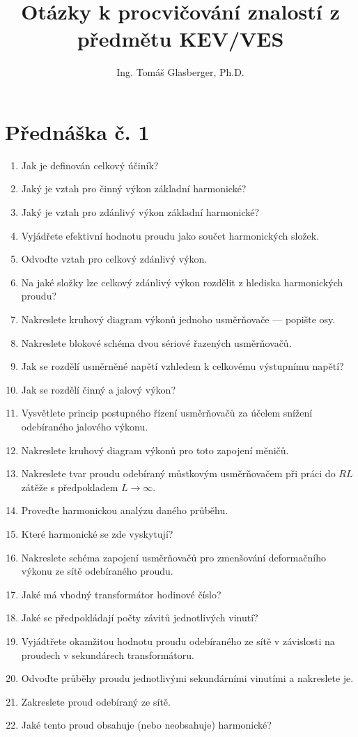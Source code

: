 \documentclass[a4paper, 12pt]{article}
\title{Otázky k procvičování znalostí z předmětu KEV/VES}
\author{Ing. Tomáš Glasberger, Ph.D.}
\begin{document}
\maketitle

\section{Přednáška č. 1}
\begin{enumerate}
    \item Jak je definován celkový účiník?
    \item Jaký je vztah pro činný výkon základní harmonické?
    \item Jaký je vztah pro zdánlivý výkon základní harmonické?
    \item Vyjádřete efektivní hodnotu proudu jako součet harmonických složek.
    \item Odvoďte vztah pro celkový zdánlivý výkon.
    \item Na jaké složky lze celkový zdánlivý výkon rozdělit z hlediska harmonických proudu?
    \item Nakreslete kruhový diagram výkonů jednoho usměrňovače --- popište osy.
    \item Nakreslete blokové schéma dvou sériové řazených usměrňovačů. 
    \item Jak se rozdělí usměrněné napětí vzhledem k celkovému výstupnímu napětí?
    \item Jak se rozdělí činný a jalový výkon?
    \item Vysvětlete princip postupného řízení usměrňovačů za účelem snížení odebíraného jalového výkonu.
    \item Nakreslete kruhový diagram výkonů pro toto zapojení měničů.
    \item Nakreslete tvar proudu odebíraný můstkovým usměrňovačem při práci do
        $RL$ zátěže s předpokladem $L\rightarrow \infty $.
    \item Proveďte harmonickou analýzu daného průběhu. 
    \item Které harmonické se zde vyskytují?
    \item Nakreslete schéma zapojení usměrňovačů pro zmenšování deformačního výkonu ze sítě odebíraného proudu.
    \item Jaké má vhodný transformátor hodinové číslo?
    \item Jaké se předpokládají počty závitů jednotlivých vinutí?
    \item Vyjádtřete okamžitou hodnotu proudu odebíraného ze sítě v závislosti
      na proudech v sekundárech transformátoru.
    \item Odvoďte průběhy proudu jednotlivými sekundárními vinutími a nakreslete je.
    \item Zakreslete proud odebíraný ze sítě.
    \item Jaké tento proud obsahuje (nebo neobsahuje) harmonické?

\end{enumerate}
\end{document}
